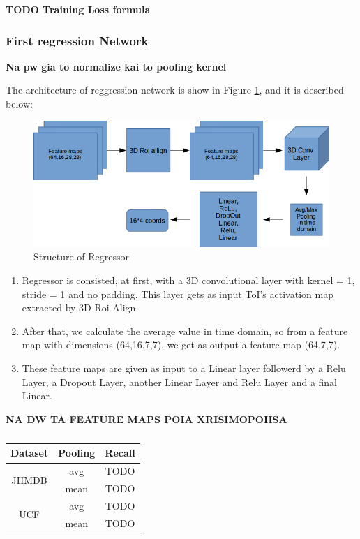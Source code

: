 \documentclass{report}
\begin{document}
\textbf{TODO Training Loss formula}

\subsubsection{First regression Network} \textbf{Na pw gia to normalize kai to pooling kernel}\par
The architecture of reggression network is show in Figure \ref{fig:regressor_3d}, and it is described below:
\begin{figure}[h]
  \centering
  \includegraphics[scale=0.48]{regressor_1_1}
  \caption{Structure of Regressor}
  \label{fig:regressor_3d}
\end{figure}

\begin{enumerate}
\item Regressor is consisted, at first, with a 3D convolutional layer with kernel = 1, stride = 1 and no padding. This layer gets as input ToI's activation map extracted by 3D Roi Align.
\item After that, we calculate the average value in time domain, so from a feature map with dimensions (64,16,7,7), we get as output a feature map (64,7,7).
\item These feature maps are given as input to a Linear layer followerd by a Relu Layer, a Dropout Layer, another Linear Layer and Relu Layer and a final Linear.
\end{enumerate}

\textbf{NA DW TA FEATURE MAPS POIA XRISIMOPOIISA}
\begin{table}[h]
  \centering
  \begin{tabular} {||c | c | c ||}
    \hline
    \textbf{Dataset} & \textbf{Pooling} & Recall \\
    \hline                
    \multirow{2}{*}{JHMDB} & avg & TODO \\
    \cline{2-3}
    {} & mean & TODO \\
    \cline{1-3}
    \multirow{2}{*}{UCF} & avg & TODO \\
    \cline{2-3}
    {} & mean & TODO \\
    \cline{1-3}
                                   
  \end{tabular}
  \caption{}
  \label{table:reg_1_1}
\end{table}
\end{document}
